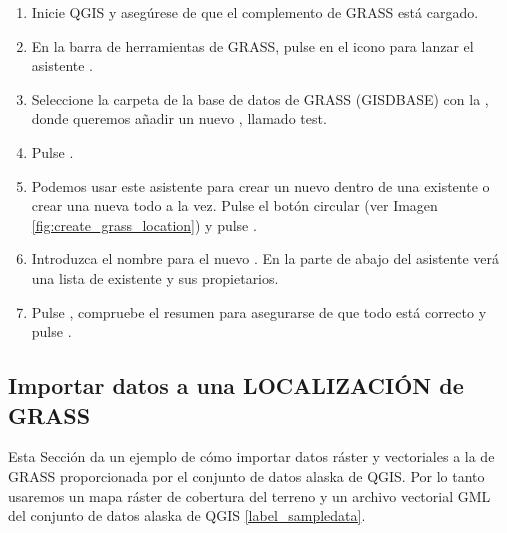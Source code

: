 \begin{enumerate}
  \item Inicie QGIS y asegúrese de que el complemento de GRASS está cargado.
  \item En la barra de herramientas de GRASS, pulse en el icono 
   para lanzar el asistente
  .
  \item Seleccione la carpeta de la base de datos de GRASS (GISDBASE)  
  con la , donde queremos añadir un nuevo 
  , llamado test.
  \item Pulse . 
  \item Podemos usar este asistente para crear un nuevo  dentro de 
  una  existente o crear una nueva  
  todo a la vez. Pulse el botón circular
  (ver Imagen \ref{fig:create_grass_location}) y pulse .
  \item Introduzca el nombre  para el nuevo . En la parte de abajo 
  del asistente verá una lista de  existente y sus propietarios.
  \item Pulse , compruebe el resumen para asegurarse de que todo está correcto y pulse .
\end{enumerate}

\subsection{Importar datos a una LOCALIZACIÓN de GRASS}\label{sec:import_loc_data}

Esta Sección da un ejemplo de cómo importar datos ráster y vectoriales a la 
 de GRASS proporcionada por el conjunto de datos alaska de QGIS. Por lo tanto usaremos un mapa ráster de cobertura
del terreno  y un archivo vectorial GML  del conjunto de datos alaska de QGIS \ref{label_sampledata}.

